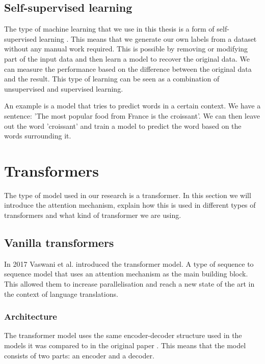 \subsection{Self-supervised learning}

The type of machine learning that we use in this thesis is a form of self-supervised learning \cite{doersch_multi-task_2017}. This means that we generate our own labels from a dataset without any manual work required. This is possible by removing or modifying part of the input data and then learn a model to recover the original data. We can measure the performance based on the difference between the original data and the result. This type of learning can be seen as a combination of unsupervised and supervised learning.

An example is a model that tries to predict words in a certain context. We have a sentence: 'The most popular food from France is the croissant'. We can then leave out the word 'croissant' and train a model to predict the word based on the words surrounding it.

\section{Transformers}
\label{sec:prelim:transformers}

The type of model used in our research is a transformer. In this section we will introduce the attention mechanism, explain how this is used in different types of transformers and what kind of transformer we are using.

\subsection{Vanilla transformers}
\label{sec:prelim:transformers:vanilla}

In 2017 Vaswani et al.\cite{vaswani_attention_2017} introduced the transformer model. A type of sequence to sequence model that uses an attention mechanism as the main building block. This allowed them to increase parallelisation and reach a new state of the art in the context of language translations.

\subsubsection{Architecture}

The transformer model uses the same encoder-decoder structure used in the models it was compared to in the original paper \cite{bahdanau_neural_2016, cho_learning_2014}. This means that the model consists of two parts: an encoder and a decoder.

